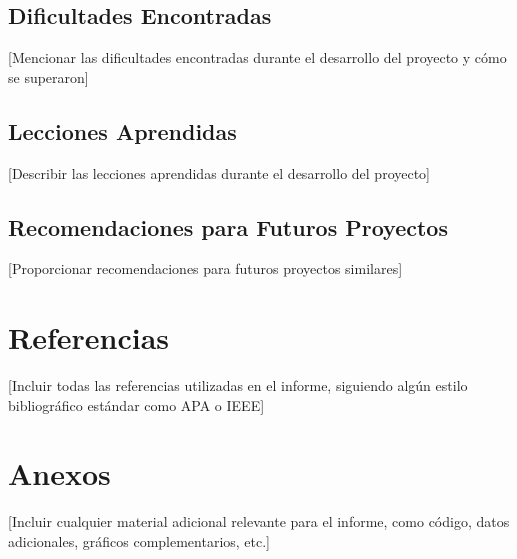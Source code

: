 \documentclass[12pt,letterpaper]{report}
\begin{document}
\section{Dificultades Encontradas}
[Mencionar las dificultades encontradas durante el desarrollo del proyecto y cómo se superaron]

\section{Lecciones Aprendidas}
[Describir las lecciones aprendidas durante el desarrollo del proyecto]

\section{Recomendaciones para Futuros Proyectos}
[Proporcionar recomendaciones para futuros proyectos similares]

\chapter*{Referencias}

[Incluir todas las referencias utilizadas en el informe, siguiendo algún estilo bibliográfico estándar como APA o IEEE]

\chapter*{Anexos}

[Incluir cualquier material adicional relevante para el informe, como código, datos adicionales, gráficos complementarios, etc.]
\end{document}
